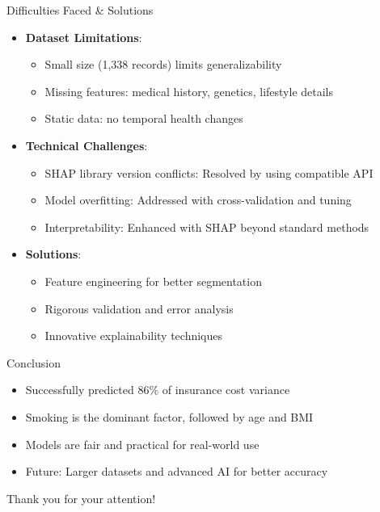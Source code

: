 \documentclass[10pt]{beamer}
\begin{document}
\begin{frame}{Difficulties Faced \& Solutions}
\begin{itemize}
\item \textbf{Dataset Limitations}:
  \begin{itemize}
  \item Small size (1,338 records) limits generalizability
  \item Missing features: medical history, genetics, lifestyle details
  \item Static data: no temporal health changes
  \end{itemize}
\item \textbf{Technical Challenges}:
  \begin{itemize}
  \item SHAP library version conflicts: Resolved by using compatible API
  \item Model overfitting: Addressed with cross-validation and tuning
  \item Interpretability: Enhanced with SHAP beyond standard methods
  \end{itemize}
\item \textbf{Solutions}:
  \begin{itemize}
  \item Feature engineering for better segmentation
  \item Rigorous validation and error analysis
  \item Innovative explainability techniques
  \end{itemize}
\end{itemize}
\end{frame}

\begin{frame}{Conclusion}
\begin{itemize}
\item Successfully predicted 86\% of insurance cost variance
\item Smoking is the dominant factor, followed by age and BMI
\item Models are fair and practical for real-world use
\item Future: Larger datasets and advanced AI for better accuracy
\end{itemize}
\begin{center}
Thank you for your attention!
\end{center}
\end{frame}
\end{document}
